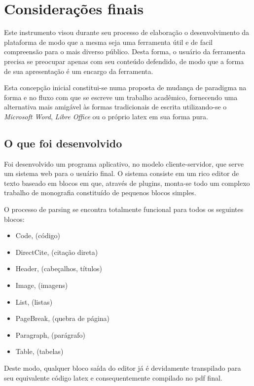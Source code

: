 \chapter{Considerações finais}

Este instrumento visou durante seu processo de
elaboração o desenvolvimento da plataforma de modo
que a mesma seja uma ferramenta útil e de
facil compreensão para o mais diverso público.
Desta forma, o usuário da ferramenta precisa se preocupar
apenas com seu conteúdo defendido, de modo que a forma de
sua apresentação é um encargo da ferramenta.

Esta concepção inicial constitui-se numa proposta de mudança 
de paradigma na forma e no fluxo com que se escreve um trabalho
acadêmico, fornecendo uma alternativa mais amigável às formas
tradicionais de escrita utilizando-se o \textit{Microsoft Word},
\textit{Libre Office} ou o próprio
\acrshort{latex}
em sua forma pura.

\section{O que foi desenvolvido}

Foi desenvolvido um programa aplicativo, no modelo cliente-servidor,
que serve um sistema
\acrshort{web}
para o usuário final. O sistema consiste em um rico editor de texto
baseado em blocos em que, através de plugins, monta-se todo um complexo
trabalho de monografia constituído de pequenos blocos simples.

O processo de parsing se encontra totalmente funcional para todos os seguintes blocos:

\begin{itemize}
        
	\item Code, (código)
	\item DirectCite, (citação direta)
	\item Header, (cabeçalhos, títulos)
	\item Image, (imagens)
	\item List, (listas)
	\item PageBreak, (quebra de página)
	\item Paragraph, (parágrafo)
	\item Table, (tabelas)
    
\end{itemize}

Deste modo, qualquer bloco saída do editor já é devidamente transpilado para seu equivalente
código
\acrshort{latex}
e consequentemente compilado no
\acrshort{pdf} final.

